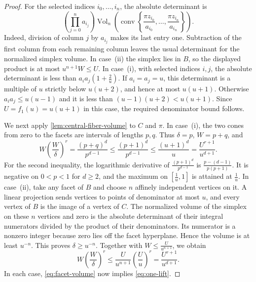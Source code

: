 \documentclass[reqno, 11pt]{article}
\numberwithin{equation}{section}
\theoremstyle{definition}
\DeclareMathOperator{\conv}{conv}
\DeclareMathOperator{\Vol}{Vol}
\begin{document}
\begin{proof}
For the selected indices $i_0,\ldots,i_n$, the absolute determinant
is
\[
 \left(\prod_{j=0}^{n}a_{i_j}\right)
 \Vol_n\left(\conv\left\{\frac{\pi z_{i_0}}{a_{i_0}},\ldots,
                             \frac{\pi z_{i_n}}{a_{i_n}}\right\}\right).
\]
Indeed, division of column $j$ by $a_{i_j}$ makes its last entry
one. Subtraction of the first column from each remaining column
leaves the usual determinant for the normalized simplex volume.
In case~(ii) the simplex lies in $B$, so the displayed product is at
most $u^{n+1}W\le U$. In case~(i), with selected indices $i,j$,
the absolute determinant is less than $a_i a_j(1+\frac{2}{u})$.
If $a_i=a_j=u$, this determinant is a multiple of $u$ strictly
below $u(u+2)$, and hence at most $u(u+1)$. Otherwise $a_i a_j\le
u(u-1)$ and it is less than $(u-1)(u+2)<u(u+1)$. Since $U=f_1(u)
=u(u+1)$ in this case, the required denominator bound follows.

We next apply \cref{lem:central-fiber-volume} to $C$ and $\pi$. In
case~(i), the two cones from zero to the facets are intervals of
lengths $p,q$. Thus $\delta=p$, $W=p+q$, and
\[
 W\left(\frac{W}{\delta}\right)^r
 =\frac{(p+q)^d}{p^{d-1}}\le\frac{(p+1)^d}{p^{d-1}}
 \le\frac{(u+1)^d}{u}=\frac{U^{r+1}}{u^{d+1}}.
\]
For the second inequality, the logarithmic derivative of
$\frac{(p+1)^d}{p^{d-1}}$ is $\frac{p-(d-1)}{p(p+1)}$.
It is negative on $0<p<1$ for $d\ge2$, and the maximum on
$[\frac{1}{u},1]$ is attained at $\frac{1}{u}$.
In case~(ii), take any facet of $B$ and choose $n$ affinely
independent vertices on it. A linear projection sends vertices to
points of denominator at most $u$, and every vertex of $B$ is the
image of a vertex of $C$. The normalized volume of the simplex
on these $n$ vertices and zero is the absolute determinant of their
integral numerators divided by the product of their denominators.
Its numerator is a nonzero integer because zero lies off the facet
hyperplane. Hence the volume is at least $u^{-n}$. This proves
$\delta\ge u^{-n}$. Together with $W\le\frac{U}{u^{n+1}}$, we obtain
\[
  W\left(\frac{W}{\delta}\right)^r\le
  \frac{U}{u^{n+1}}\left(\frac{U}{u}\right)^r
  =\frac{U^{r+1}}{u^{d+1}} .
\]
In each case, \eqref{eq:facet-volume} now implies \eqref{eq:one-lift}.


\end{proof}
\end{document}
